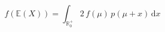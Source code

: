 \documentclass[preview]{standalone}
\begin{document}
\begin{equation}
\tag{23:lhs_final}
    f ( \mathbb{E} ( X ) ) = \int_{\mathbb{R}^+_0} 2 \, f ( \mu ) \, p ( \mu + x ) \, \mathrm{d}x
\end{equation}
\end{document}
